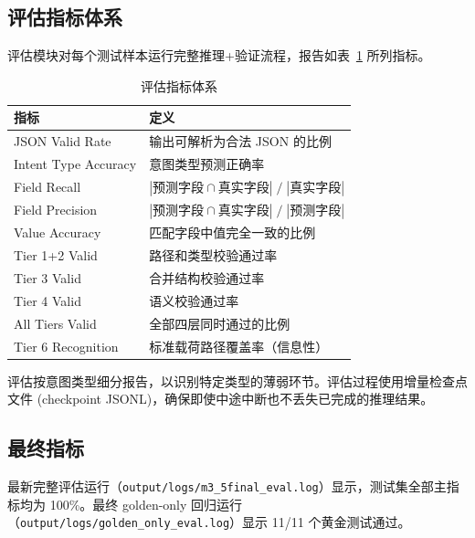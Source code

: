 \documentclass[12pt, a4paper]{article}
\begin{document}
\subsection{评估指标体系}

评估模块对每个测试样本运行完整推理+验证流程，报告如表~\ref{tab:eval-metrics} 所列指标。

\begin{table}[H]
\centering
\caption{评估指标体系}
\label{tab:eval-metrics}
\small
\begin{tabular}{lp{9.5cm}}
\toprule
\textbf{指标} & \textbf{定义} \\
\midrule
JSON Valid Rate       & 输出可解析为合法 JSON 的比例 \\
Intent Type Accuracy  & 意图类型预测正确率 \\
Field Recall          & $|\text{预测字段} \cap \text{真实字段}| \;/\; |\text{真实字段}|$ \\
Field Precision       & $|\text{预测字段} \cap \text{真实字段}| \;/\; |\text{预测字段}|$ \\
Value Accuracy        & 匹配字段中值完全一致的比例 \\
Tier 1+2 Valid        & 路径和类型校验通过率 \\
Tier 3 Valid          & 合并结构校验通过率 \\
Tier 4 Valid          & 语义校验通过率 \\
All Tiers Valid       & 全部四层同时通过的比例 \\
Tier 6 Recognition    & 标准载荷路径覆盖率（信息性）\\
\bottomrule
\end{tabular}
\end{table}

\noindent
评估按意图类型细分报告，以识别特定类型的薄弱环节。评估过程使用增量检查点文件 (checkpoint JSONL)，确保即使中途中断也不丢失已完成的推理结果。

\subsection{最终指标}

最新完整评估运行（\texttt{output/logs/m3\_5final\_eval.log}）显示，测试集全部主指标均为 100\%。最终 golden-only 回归运行（\texttt{output/logs/golden\_only\_eval.log}）显示 11/11 个黄金测试通过。
\end{document}
